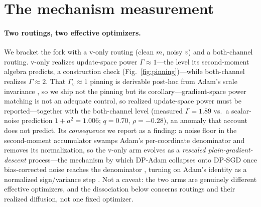 \section{The mechanism measurement}
\label{sec:mechanism}

\paragraph{Two routings, two effective optimizers.}
We bracket the fork with a v-only routing (clean $m$, noisy $v$) and a
both-channel routing. v-only realizes update-space power $\Gamma\approx1$---the
level its second-moment algebra predicts, a construction check
(Fig.~\ref{fig:pinning})---while both-channel realizes $\Gamma\approx2$. That
$\Gamma_v\approx1$ pinning is derivable post-hoc from Adam's scale invariance
\citep{adam}, so we ship not the pinning but its corollary---gradient-space power
matching is not an adequate control, so realized update-space power must be
reported---together with the both-channel level (measured $\Gamma=1.89$ vs.\ a
scalar-noise prediction $1+a^2=1.006$; $q=0.70$, $\rho=-0.28$), an anomaly that
account does not predict. Its \emph{consequence} we report as a finding: a noise
floor in the second-moment accumulator swamps Adam's per-coordinate denominator
and removes its normalization, so the v-only arm evolves as a \emph{rescaled
plain-gradient-descent} process---the mechanism by which DP-Adam collapses onto
DP-SGD once bias-corrected noise reaches the denominator \citep{dpadambc,litramer},
turning on Adam's identity as a normalized sign/variance step
\citep{adam,balleshennig,kunstner,amsgrad}. Not a caveat: the two arms are
genuinely different effective optimizers, and the dissociation below concerns
routings and their realized diffusion, not one fixed optimizer.

